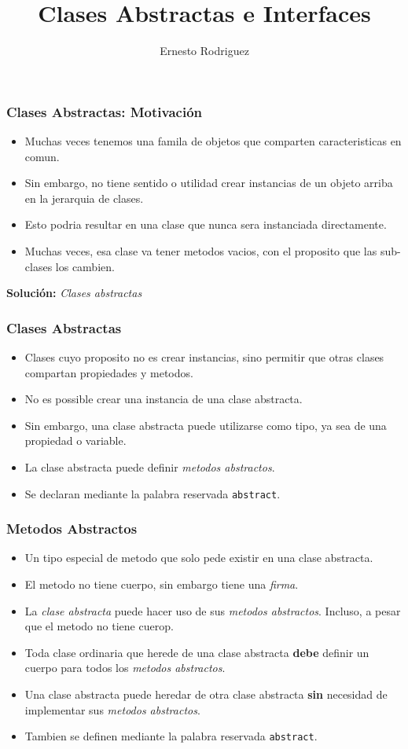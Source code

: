 \documentclass{beamer}
\title{Clases Abstractas e Interfaces}
\author{Ernesto Rodriguez}
\institute{
    Universidad del Itsmo \\
    \medskip \textit{erodriguez@unis.edu.gt}
}
\date[\today]{}
\begin{document}
\begin{frame}
\titlepage
\end{frame}

\begin{frame}
    \frametitle{Clases Abstractas: Motivaci\'on}
    \begin{itemize}
        \item{Muchas veces tenemos una famila de objetos que comparten caracteristicas en comun.}
        \item{Sin embargo, no tiene sentido o utilidad crear instancias de un objeto arriba en la jerarquia de clases.}
        \item{Esto podria resultar en una clase que nunca sera instanciada directamente.}
        \item{Muchas veces, esa clase va tener metodos vacios, con el proposito que las sub-clases los cambien.}
    \end{itemize}
    {\bf Soluci\'on:} \emph{Clases abstractas}
\end{frame}

\begin{frame}
    \frametitle{Clases Abstractas}
    \begin{itemize}
        \item{Clases cuyo proposito no es crear instancias, sino permitir
            que otras clases compartan propiedades y metodos.}
        \item{No es possible crear una instancia de una clase abstracta.}
        \item{Sin embargo, una clase abstracta puede utilizarse como tipo,
            ya sea de una propiedad o variable.}
        \item{La clase abstracta puede definir \emph{metodos abstractos}.}
        \item{Se declaran mediante la palabra reservada \texttt{abstract}.}
    \end{itemize}
\end{frame}

\begin{frame}
    \frametitle{Metodos Abstractos}
    \begin{itemize}
        \item{Un tipo especial de metodo que solo pede existir en una clase abstracta.}
        \item{El metodo no tiene cuerpo, sin embargo tiene una \emph{firma}.}
        \item{La \emph{clase abstracta} puede hacer uso de sus \emph{metodos abstractos}.
            Incluso, a pesar que el metodo no tiene cuerop.}
        \item{Toda clase ordinaria que herede de una clase abstracta {\bf debe} definir
            un cuerpo para todos los \emph{metodos abstractos}}.
        \item{Una clase abstracta puede heredar de otra clase abstracta {\bf sin}
            necesidad de implementar sus \emph{metodos abstractos}.}
        \item{Tambien se definen mediante la palabra reservada \texttt{abstract}.}
        \end{itemize}
\end{frame}
\end{document}
